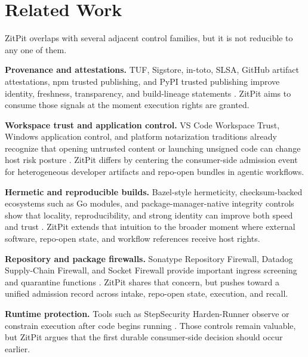 \documentclass[conference]{IEEEtran}
\newcommand{\product}{ZitPit}
\begin{document}
\section{Related Work}

\product{} overlaps with several adjacent control families, but it is not reducible to any one of them.

\textbf{Provenance and attestations.} TUF, Sigstore, in-toto, SLSA, GitHub artifact attestations, npm trusted publishing, and PyPI trusted publishing improve identity, freshness, transparency, and build-lineage statements \cite{tufDocs2026,tufPaper2016,sigstoreDocs2026,intotoDocs2026,intotoPaper2019,slsaDocs2026,githubArtifactAttestations2026,npmTrustedPublishing2026,pypiTrustedPublishing2026,pypiAttestations2026}. \product{} aims to consume those signals at the moment execution rights are granted.

\textbf{Workspace trust and application control.} VS Code Workspace Trust, Windows application control, and platform notarization traditions already recognize that opening untrusted content or launching unsigned code can change host risk posture \cite{vscodeWorkspaceTrust2026,windowsAppControl2026,appleGatekeeper2026}. \product{} differs by centering the consumer-side admission event for heterogeneous developer artifacts and repo-open bundles in agentic workflows.

\textbf{Hermetic and reproducible builds.} Bazel-style hermeticity, checksum-backed ecosystems such as Go modules, and package-manager-native integrity controls show that locality, reproducibility, and strong identity can improve both speed and trust \cite{bazelHermeticity2026,goChecksum2026,pipSecureInstalls2026,cargoSourceReplacement2026}. \product{} extends that intuition to the broader moment where external software, repo-open state, and workflow references receive host rights.

\textbf{Repository and package firewalls.} Sonatype Repository Firewall, Datadog Supply-Chain Firewall, and Socket Firewall provide important ingress screening and quarantine functions \cite{sonatypeRepositoryFirewall2026,datadogSupplyChainFirewall2026,socketFirewall2026}. \product{} shares that concern, but pushes toward a unified admission record across intake, repo-open state, execution, and recall.

\textbf{Runtime protection.} Tools such as StepSecurity Harden-Runner observe or constrain execution after code begins running \cite{stepSecurityHardenRunner2026}. Those controls remain valuable, but \product{} argues that the first durable consumer-side decision should occur earlier.
\end{document}
